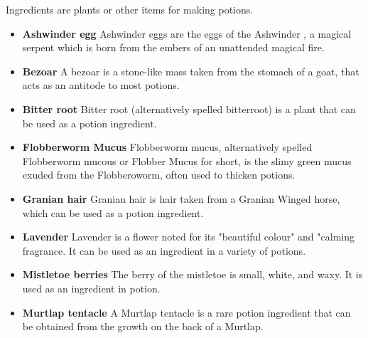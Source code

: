Ingredients are plants or other items for making potions.\\

\begin{itemize}
 \item \textbf {Ashwinder egg}
 Ashwinder eggs are the eggs of the Ashwinder , a magical serpent  which is born from the embers of an unattended magical fire.

 \item \textbf {Bezoar}
A bezoar is a stone-like mass taken from the stomach of a goat, that acts as an antitode to most potions.

 \item \textbf {Bitter root}
Bitter root (alternatively spelled bitterroot) is a plant that can be used as a potion ingredient.

 \item \textbf {Flobberworm Mucus}
  Flobberworm mucus, alternatively spelled Flobberworm mucous or Flobber Mucus for short, is the slimy green mucus exuded from the Flobberoworm, often used to thicken potions.

 \item \textbf {Granian hair}
  Granian hair is hair taken from a Granian Winged horse, which can be used as a potion ingredient.

 \item \textbf {Lavender}
Lavender is a flower noted for its "beautiful colour" and "calming fragrance. It can be used as an ingredient in a variety of potions.

 \item \textbf {Mistletoe berries}
The berry of the mistletoe is small, white, and waxy. It is used as an ingredient in potion.

 \item \textbf {Murtlap tentacle}
A Murtlap tentacle is a rare potion ingredient that can be obtained from the growth on the back of a Murtlap.


\end{itemize}
